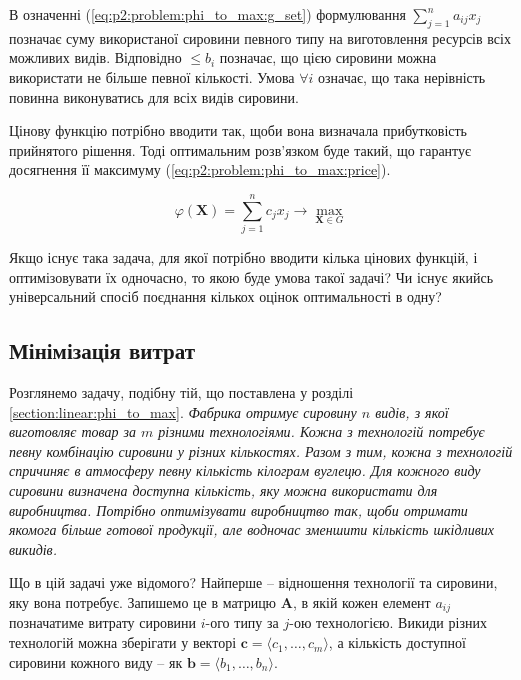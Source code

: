 \documentclass[\main/book.tex]{subfiles}
\begin{document}
В означенні (\ref{eq:p2:problem:phi_to_max:g_set}) фор\-му\-лю\-ва\-ння ${\sum_{j=1}^n a_{ij} x_j}$ позначає суму використаної сировини певного типу на виготовлення ресурсів всіх можливих видів. Відповідно \flqq{}$\leq b_i$\frqq{} позначає, що цією сировини можна використати не більше певної кількості. Умова $\forall i$ означає, що така нерівність повинна виконуватись для всіх видів сировини.

Цінову функцію потрібно вводити так, щоби вона визначала прибутковість прийнятого рішення. Тоді оптимальним розв'язком буде такий, що гарантує досягнення її максимуму (\ref{eq:p2:problem:phi_to_max:price}).

\begin{equation}
 \varphi(\mathbf{X}) =
 \sum_{j=1}^n c_j x_j \rightarrow
 \max_{\mathbf{X} \in G}
 \label{eq:p2:problem:phi_to_max:price}
\end{equation}

\begin{question}
 Якщо існує така задача, для якої потрібно вводити кілька цінових функцій, і оптимізовувати їх одночасно, то якою буде умова такої задачі? Чи існує якийсь універсальний спосіб поєднання кількох оцінок оптимальності в одну?
\end{question}

\subsection{Мінімізація витрат}

Розглянемо задачу, подібну тій, що поставлена у розділі \ref{section:linear:phi_to_max}. \textit{Фабрика отримує сировину $n$ видів, з якої виготовляє товар за $m$ різними тех\-но\-ло\-гі\-я\-ми. Кожна з технологій потребує певну комбінацію сировини у різних кількостях. Разом з тим, кожна з технологій спричиняє в атмосферу певну кількість кілограм вуглецю. Для кожного виду сировини визначена доступна кількість, яку можна використати для виробництва. Потрібно оптимізувати виробництво так, щоби отримати якомога більше готової продукції, але водночас зменшити кількість шкідливих викидів.}

Що в цій задачі уже відомого? Найперше -- відношення технології та сировини, яку вона потребує. Запишемо це в матрицю $\mathbf{A}$, в якій кожен елемент $a_{ij}$ позначатиме витрату сировини $i$-ого типу за $j$-ою технологією. Викиди різних технологій можна зберігати у векторі $\mathbf{c} = \langle c_1, \ldots, c_m \rangle$, а кількість доступної сировини кожного виду -- як $\mathbf{b} = \langle b_1, \ldots, b_n \rangle$.
\end{document}

